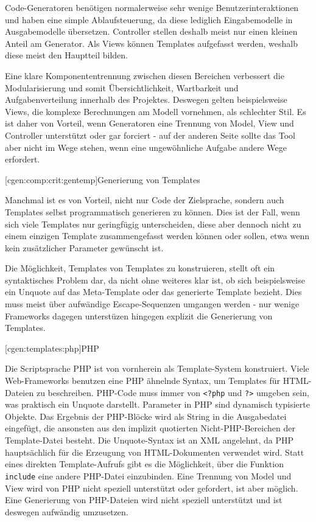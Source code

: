 \documentclass[a4paper, bibgerm]{book}
\newcommand\icode[1]{\lstinline?#1?}
\newcommand\phpo{\lstinline+<?php+}
\newcommand\phpc{\lstinline+?>+}
\newcommand\lsubsection{}
\newcommand\lsubsubsection{}
\begin{document}
Code-Generatoren benötigen normalerweise sehr wenige
Benutzerinteraktionen und haben eine simple Ablaufsteuerung, da diese
lediglich Eingabemodelle in Ausgabemodelle übersetzen. Controller
stellen deshalb meist nur einen kleinen Anteil am Generator. Als Views
können Templates aufgefasst werden, weshalb diese meist den Hauptteil
bilden.

Eine klare Komponententrennung zwischen diesen Bereichen verbessert die
Modularisierung und somit Übersichtlichkeit, Wartbarkeit und
Aufgabenverteilung innerhalb des Projektes. Deswegen gelten
beispielsweise Views, die komplexe Berechnungen am Modell vornehmen, als
schlechter Stil. Es ist daher von Vorteil, wenn Generatoren eine
Trennung von Model, View und Controller unterstützt oder gar forciert -
auf der anderen Seite sollte das Tool aber nicht im Wege stehen, wenn
eine ungewöhnliche Aufgabe andere Wege erfordert.

\lsubsubsection[cgen:comp:crit:gentemp]{Generierung von Templates}

Manchmal ist es von Vorteil, nicht nur Code der Zielsprache, sondern
auch Templates selbst programmatisch generieren zu können. Dies ist der
Fall, wenn sich viele Templates nur geringfügig unterscheiden, diese
aber dennoch nicht zu einem einzigen Template zusammengefasst werden
können oder sollen, etwa wenn kein zusätzlicher Parameter gewünscht ist.

Die Möglichkeit, Templates von Templates zu konstruieren, stellt oft ein
syntaktisches Problem dar, da nicht ohne weiteres klar ist, ob sich
beispielsweise ein Unquote auf das Meta-Template oder das generierte
Template bezieht. Dies muss meist über aufwändige Escape-Sequenzen
umgangen werden - nur wenige Frameworks dagegen unterstüzen hingegen
explizit die Generierung von Templates.

\lsubsection[cgen:templates:php]{PHP}

Die Scriptsprache PHP ist von vornherein als Template-System
konstruiert. Viele Web-Frameworks benutzen eine PHP ähnelnde Syntax, um
Templates für HTML-Dateien zu beschreiben. PHP-Code muss immer von
\phpo{} und \phpc{} umgeben sein, was praktisch ein Unquote
darstellt. Parameter in PHP sind dynamisch typisierte Objekte. Das
Ergebnis der PHP-Blöcke wird als String in die Ausgabedatei eingefügt,
die ansonsten aus den implizit quotierten Nicht-PHP-Bereichen der
Template-Datei besteht. Die Unquote-Syntax ist an XML angelehnt, da PHP
hauptsächlich für die Erzeugung von HTML-Dokumenten verwendet
wird. Statt eines direkten Template-Aufrufs gibt es die Möglichkeit,
über die Funktion \icode{include} eine andere PHP-Datei
einzubinden. Eine Trennung von Model und View wird von PHP nicht
speziell unterstützt oder gefordert, ist aber möglich. Eine Generierung
von PHP-Dateien wird nicht speziell unterstützt und ist deswegen
aufwändig umzusetzen.
\end{document}
